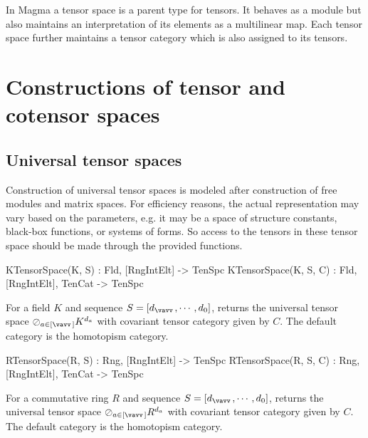 
In Magma a tensor space is a parent type for tensors.  It behaves
as a module but also maintains an interpretation of its elements as
a multilinear map.  Each tensor space further maintains a tensor category
which is also assigned to its tensors.


\section{Constructions of tensor and cotensor spaces}

\subsection{Universal tensor spaces}

Construction of universal tensor spaces is modeled after construction of free 
modules and matrix spaces. For efficiency reasons, the actual representation 
may 
vary based on the parameters, e.g. it may be a space of structure constants, 
black-box functions, or systems of forms. So access to the tensors in these 
tensor space should be made through the provided functions.

\begin{intrinsics}
KTensorSpace(K, S) : Fld, [RngIntElt] -> TenSpc
KTensorSpace(K, S, C) : Fld, [RngIntElt], TenCat -> TenSpc
\end{intrinsics}

For a field $K$ and sequence $S=[d_{\vav},\cdots, d_0]$, 
returns the universal tensor space $\rversor_{a\in [\vav]} K^{d_a}$ with covariant tensor category given by $C$.
The default category is the homotopism category.

\begin{intrinsics}
RTensorSpace(R, S) : Rng, [RngIntElt] -> TenSpc
RTensorSpace(R, S, C) : Rng, [RngIntElt], TenCat -> TenSpc
\end{intrinsics}

For a commutative ring $R$ and sequence $S=[d_{\vav},\cdots, d_0]$, 
returns the universal tensor space $\rversor_{a\in [\vav]} R^{d_a}$ with covariant tensor category given by $C$.
The default category is the homotopism category.

